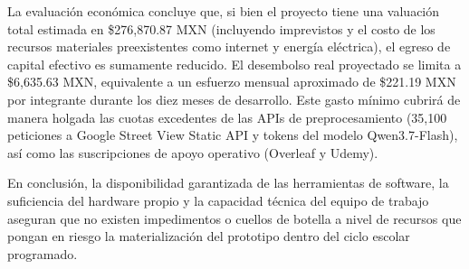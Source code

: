 \begin{itemize}
    La evaluación económica concluye que, si bien el proyecto tiene una valuación total estimada en \$276,870.87 MXN (incluyendo imprevistos y el costo de los recursos materiales preexistentes como internet y energía eléctrica), el egreso de capital efectivo es sumamente reducido. El desembolso real proyectado se limita a \$6,635.63 MXN, equivalente a un esfuerzo mensual aproximado de \$221.19 MXN por integrante durante los diez meses de desarrollo. Este gasto mínimo cubrirá de manera holgada las cuotas excedentes de las APIs de preprocesamiento (35,100 peticiones a Google Street View Static API y tokens del modelo Qwen3.7-Flash), así como las suscripciones de apoyo operativo (Overleaf y Udemy).
\end{itemize}

En conclusión, la disponibilidad garantizada de las herramientas de software, la suficiencia del hardware propio y la capacidad técnica del equipo de trabajo aseguran que no existen impedimentos o cuellos de botella a nivel de recursos que pongan en riesgo la materialización del prototipo dentro del ciclo escolar programado.